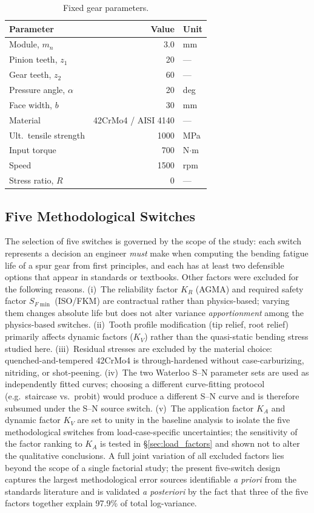 \documentclass[12pt,a4paper]{article}
\begin{document}
\begin{table}[h]
\centering
\caption{Fixed gear parameters.}
\label{tab:gear}
\begin{tabular}{p{4.5cm} r l}
\toprule
Parameter & Value & Unit \\
\midrule
Module, $m_n$ & 3.0 & mm \\
Pinion teeth, $z_1$ & 20 & --- \\
Gear teeth, $z_2$ & 60 & --- \\
Pressure angle, $\alpha$ & 20 & deg \\
Face width, $b$ & 30 & mm \\
Material & 42CrMo4 / AISI 4140 & --- \\
Ult.\ tensile strength & 1000 & MPa \\
Input torque & 700 & N$\cdot$m \\
Speed & 1500 & rpm \\
Stress ratio, $R$ & 0 & --- \\
\bottomrule
\end{tabular}
\end{table}

\subsection{Five Methodological Switches}

The selection of five switches is governed by the scope of the study:
each switch represents a decision an engineer \emph{must} make when
computing the bending fatigue life of a spur gear from first
principles, and each has at least two defensible options that appear in
standards or textbooks. Other factors were excluded for the following
reasons. (i)~The reliability factor $K_R$ (AGMA) and required safety
factor $S_{F\min}$ (ISO/FKM) are contractual rather than
physics-based; varying them changes absolute life but does not alter
variance \emph{apportionment} among the physics-based switches.
(ii)~Tooth profile modification (tip relief, root relief) primarily
affects dynamic factors ($K_V$) rather than the quasi-static bending
stress studied here. (iii)~Residual stresses are excluded by the
material choice: quenched-and-tempered 42CrMo4 is through-hardened
without case-carburizing, nitriding, or shot-peening.
(iv)~The two Waterloo S--N parameter sets are used as independently
fitted curves; choosing a different curve-fitting protocol (e.g.\
staircase vs.\ probit) would produce a different S--N curve and is
therefore subsumed under the S--N source switch.
(v)~The application factor $K_A$ and dynamic factor $K_V$ are set to
unity in the baseline analysis to isolate the five methodological
switches from load-case-specific uncertainties; the sensitivity of the
factor ranking to $K_A$ is tested in \S\ref{sec:load_factors} and
shown not to alter the qualitative conclusions. A full joint variation
of all excluded factors lies beyond the scope of a single factorial
study; the present five-switch design captures the largest
methodological error sources identifiable \emph{a priori} from the
standards literature and is validated \emph{a posteriori} by the fact
that three of the five factors together explain 97.9\% of total
log-variance.
\end{document}
